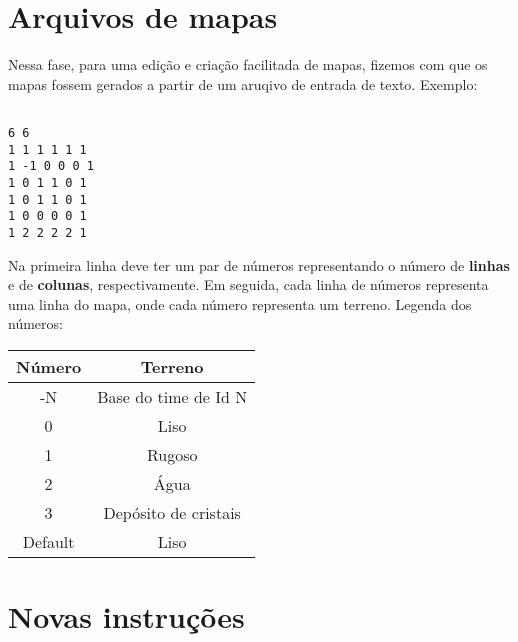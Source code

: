 \documentclass[11pt]{article}
\begin{document}
\section{Arquivos de mapas}

Nessa fase, para uma edição e criação facilitada de mapas, fizemos com que os mapas fossem gerados a partir de um aruqivo 
de entrada de texto.
Exemplo:
\begin{verbatim}

6 6
1 1 1 1 1 1
1 -1 0 0 0 1
1 0 1 1 0 1
1 0 1 1 0 1
1 0 0 0 0 1
1 2 2 2 2 1

\end{verbatim}

Na primeira linha deve ter um par de números representando o número de \textbf{linhas} e de \textbf{colunas}, respectivamente.
Em seguida, cada linha de números representa uma linha do mapa, onde cada número representa um terreno. Legenda dos números:

\begin{center}
	\begin{tabular}{ | c | c |}
	\hline
	Número & Terreno\\
	\hline 
	-N & Base do time de Id N\\
	\hline
	0 & Liso\\
	\hline
	1 & Rugoso\\
	\hline
	2 & Água\\
	\hline
	3 & Depósito de cristais\\
	\hline
	Default & Liso \\
	\hline

	\end{tabular} 
\end{center}

\section{Novas instruções}
\end{document}
